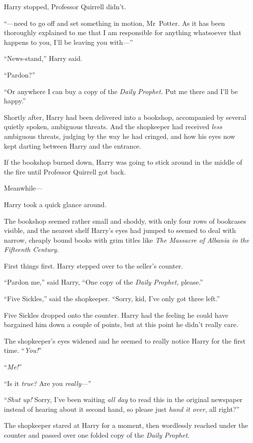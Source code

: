 Harry stopped, Professor Quirrell didn’t.

“—need to go off and set something in motion, Mr~Potter. As it has been thoroughly explained to me that I am responsible for anything whatsoever that happens to you, I’ll be leaving you with—”

“News-stand,” Harry said.

“Pardon?”

“Or anywhere I can buy a copy of the \emph{Daily Prophet.} Put me there and I’ll be happy.”

Shortly after, Harry had been delivered into a bookshop, accompanied by several quietly spoken, ambiguous threats. And the shopkeeper had received \emph{less} ambiguous threats, judging by the way he had cringed, and how his eyes now kept darting between Harry and the entrance.

If the bookshop burned down, Harry was going to stick around in the middle of the fire until Professor Quirrell got back.

Meanwhile—

Harry took a quick glance around.

The bookshop seemed rather small and shoddy, with only four rows of bookcases visible, and the nearest shelf Harry’s eyes had jumped to seemed to deal with narrow, cheaply bound books with grim titles like \emph{The Massacre of Albania in the Fifteenth Century.}

First things first. Harry stepped over to the seller’s counter.

“Pardon me,” said Harry, “One copy of the \emph{Daily Prophet,} please.”

“Five Sickles,” said the shopkeeper. “Sorry, kid, I’ve only got three left.”

Five Sickles dropped onto the counter. Harry had the feeling he could have bargained him down a couple of points, but at this point he didn’t really care.

The shopkeeper’s eyes widened and he seemed to really notice Harry for the first time. “\emph{You!}”

“\emph{Me!}”

“Is it \emph{true?} Are you \emph{really}—”

“\emph{Shut up!} Sorry, I’ve been waiting \emph{all day} to read this in the original newspaper instead of hearing about it second hand, so please just \emph{hand it over}, all right?”

The shopkeeper stared at Harry for a moment, then wordlessly reached under the counter and passed over one folded copy of the \emph{Daily Prophet}.

